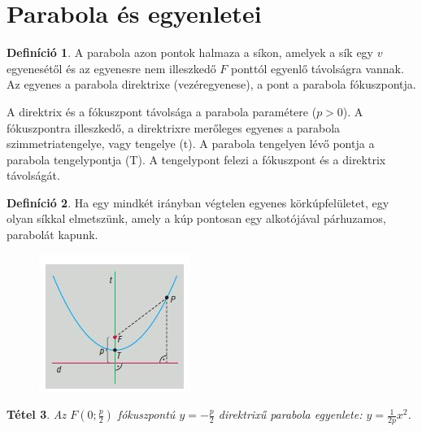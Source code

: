 \documentclass[twoside,12pt]{report}
\newtheorem{theorem}{Tétel}[section]
\theoremstyle{definition}
\newtheorem{definition}[theorem]{Definíció}
\begin{document}
\section{Parabola és egyenletei}
	\begin{definition}
		A parabola azon pontok halmaza a síkon, amelyek a sík egy $v$ egyenesétől és az egyenesre
		nem illeszkedő $F$ ponttól egyenlő távolságra vannak. Az egyenes a parabola direktrixe (vezéregyenese), a pont a parabola fókuszpontja.
	\end{definition}
	A direktrix és a fókuszpont távolsága a parabola paramétere ($p>0$). A fókuszpontra illeszkedő, a direktrixre merőleges egyenes a parabola szimmetriatengelye, vagy tengelye (t). A parabola tengelyen lévő pontja a parabola tengelypontja (T). A tengelypont felezi a fókuszpont és a direktrix távolságát.
	\begin{definition}
		Ha egy mindkét irányban végtelen egyenes körkúpfelületet, egy olyan síkkal elmetszünk, amely a kúp pontosan egy alkotójával párhuzamos, parabolát kapunk.
	\end{definition}
	\begin{figure}[H]
		\centering
		\includegraphics[width=0.4\linewidth]{Par}
	\end{figure}
	\begin{theorem}
		Az $F\left(0;\frac{p}{2}\right)$ fókuszpontú $y=-\frac{p}{2}$ direktrixű parabola egyenlete: $y=\frac{1}{2p}x^2$.
	\end{theorem}
\end{document}
